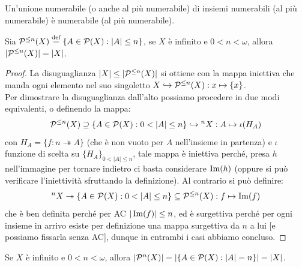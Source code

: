 \begin{corollary}
	Un'unione numerabile (o anche al pi\`u numerabile) di insiemi numerabili (al pi\`u numerabile) \`e numerabile (al pi\`u numerabile).
\end{corollary}

\begin{remark}
	Sia $\mathcal{P}^{\leq n}(X) \overset{\text{def}}{=} \{A \in \mathcal{P}(X) : |A| \leq n\}$, se $X$ \`e infinito e $0 < n < \omega$, allora $|\mathcal{P}^{\leq n}(X)| = |X|$.
\end{remark}

\begin{proof}
	La disuguaglianza $|X| \leq |\mathcal{P}^{\leq n}(X)|$ si ottiene con la mappa iniettiva che manda ogni elemento nel suo singoletto $X \hookrightarrow \mathcal{P}^{\leq n}(X) : x \mapsto \{x\}$.\\
	Per dimostrare la disuguaglianza dall'alto possiamo procedere in due modi equivalenti, o definendo la mappa:
	\[ \mathcal{P}^{\leq n}(X) \supseteq \{A \in \mathcal{P}(X) : 0 < |A| \leq n\} \hookrightarrow {}^n X : A \mapsto \iota(H_A)
		\]
	con $H_A = \{f : n \twoheadrightarrow A\}$ (che \`e non vuoto per $A$ nell'insieme in partenza) e $\iota$ funzione di scelta su $\{H_A\}_{0 < |A| \leq n}$, tale mappa \`e iniettiva perch\'e, presa $h$ nell'immagine per tornare indietro ci basta considerare $\operatorname{Im}(h)$ (oppure si 
	pu\`o verificare l'iniettivit\`a sfruttando la definizione). Al contrario si pu\`o definire:
	\[ {}^n X \twoheadrightarrow \{A \in \mathcal{P}(X) : 0 < |A| \leq n\} \subseteq \mathcal{P}^{\leq n}(X) : f \mapsto \operatorname{Im}(f)
		\]
	che \`e ben definita perch\'e per AC $|\operatorname{Im}(f)| \leq n$, ed \`e surgettiva perch\'e per ogni insieme in arrivo esiste per definizione una mappa surgettiva da $n$ a lui [e possiamo fissarla senza AC], dunque in entrambi i casi abbiamo concluso.
\end{proof}

\begin{exercise}[$|\ps^{n}(X)| = |X|$]
	Se $X$ \`e infinito e $0<n<\omega$, allora $|\mathcal{P}^n(X)| = |\{A \in \mathcal{P}(X) : |A| = n\}| = |X|$.
\end{exercise}

